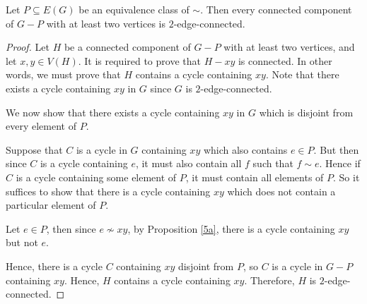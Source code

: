 \documentclass{unswmaths}
\begin{document}
\begin{proposition}
    Let $P \subseteq E(G)$ be an equivalence class of $\sim$. Then every connected
    component of $G-P$ with at least two vertices is $2$-edge-connected.
\end{proposition}
\begin{proof}
    Let $H$ be a connected component of $G-P$ with at least two vertices, and 
    let $x,y \in V(H)$. It is required to prove that $H - xy$ is connected. 
    In other words, we must prove that $H$ contains a cycle containing $xy$. 
    Note that there exists a cycle containing $xy$ in $G$ since $G$ is $2$-edge-connected.
    
    We now show that there exists a cycle containing $xy$ in $G$ which is disjoint
    from every element of $P$. 
    
    Suppose that $C$ is a cycle in $G$ containing $xy$ which also contains $e \in P$.
    But then since $C$ is a cycle containing $e$, it must also contain all $f$
    such that $f \sim e$. Hence if $C$ is a cycle containing some element of $P$,
    it must contain all elements of $P$. So it suffices to show that there is a cycle
    containing $xy$ which does not contain a particular element of $P$.
    
    Let $e \in P$, then since $e \nsim xy$, by Proposition \ref{5a}, there is a cycle
    containing $xy$ but not $e$.
    
    Hence, there is a cycle $C$ containing $xy$ disjoint from $P$, so $C$ is a cycle
    in $G-P$ containing $xy$. Hence, $H$ contains a cycle containing $xy$. Therefore,
    $H$ is $2$-edge-connected.
\end{proof}
\end{document}
